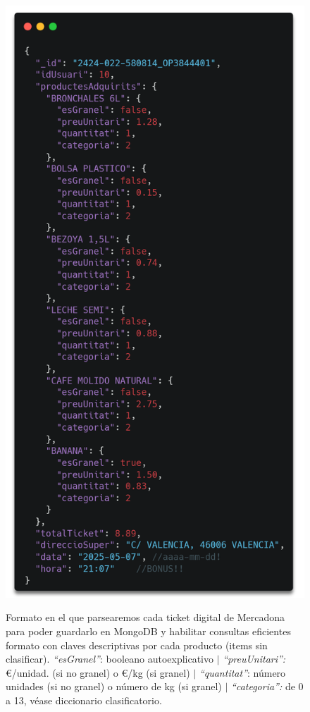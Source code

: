 \documentclass[a4paper,12pt]{report}
\begin{document}
		\FloatBarrier
		\setlength{\belowcaptionskip}{3pt}
		\begin{figure}[H]
			\centering
			\caption{Formato en el que parsearemos cada ticket digital de Mercadona para poder guardarlo en MongoDB y habilitar consultas eficientes formato con claves descriptivas por cada producto (items sin clasificar). \textit{``esGranel''}: booleano autoexplicativo $|$ \textit{``preuUnitari'':} €/unidad. (si no granel) o €/kg (si granel) $|$ \textit{``quantitat''}: número unidades (si no granel) o número de kg (si granel) $|$ \textit{``categoria'':} de 0 a 13, véase diccionario clasificatorio.}
			\includegraphics[width=.75\linewidth]{img/ticketJsonEstructuratMostraAMBCLAUS}
			\label{fig:ticketJsonEstructuratMostraAMBCLAUS}
		\end{figure}
		\FloatBarrier
		
\end{document}
